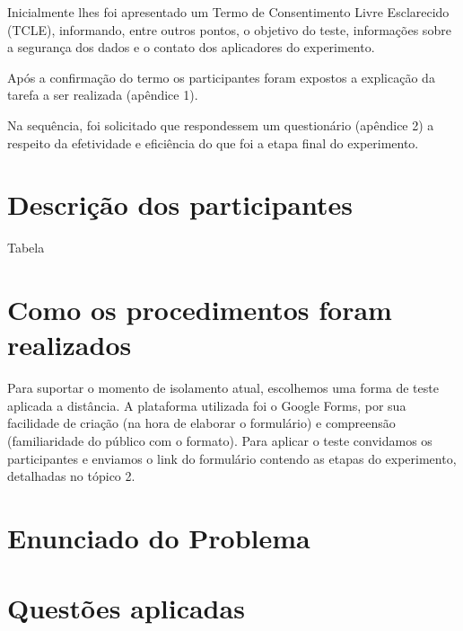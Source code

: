 \documentclass[12pt]{article}
\begin{document}
Inicialmente lhes foi apresentado um Termo de Consentimento Livre Esclarecido (TCLE), informando, entre outros pontos, o objetivo do teste, informações sobre a segurança dos dados e o contato dos aplicadores do experimento.

Após a confirmação do termo os participantes foram expostos a explicação da tarefa a ser realizada (apêndice 1).

Na sequência, foi solicitado que respondessem um questionário (apêndice 2) a respeito da efetividade e eficiência do que foi a etapa final do experimento.

\section{Descrição dos participantes}

Tabela

\section{Como os procedimentos foram realizados}

Para suportar o momento de isolamento atual, escolhemos uma forma de teste aplicada a distância. A plataforma utilizada foi o Google Forms, por sua facilidade de criação (na hora de elaborar o formulário) e compreensão (familiaridade do público com o formato). 
Para aplicar o teste convidamos os participantes e enviamos o link do formulário contendo as etapas do experimento, detalhadas no tópico 2.

\section{Enunciado do Problema}

\section{Questões aplicadas}

% 
% 
\end{document}
